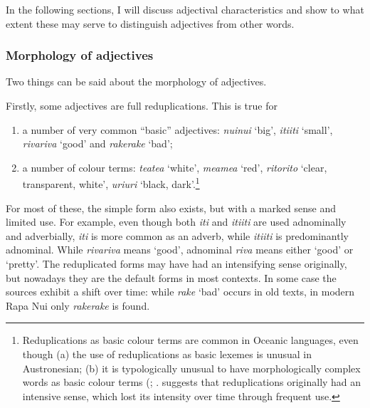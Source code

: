 In the following sections, I will discuss adjectival characteristics and show to what extent these may serve to distinguish adjectives from other words.

\subsubsection[Morphology of adjectives]{Morphology of adjectives}\label{sec:3.5.1.2}

Two things can be said about the morphology of adjectives.

Firstly, some adjectives are full reduplications. This is true for 

\begin{enumerate}
\item 
a number of very common “basic” adjectives: \textit{nuinui} ‘big’, \textit{{\ꞌ}iti{\ꞌ}iti} ‘small’, \textit{rivariva} ‘good’ and \textit{rakerake} ‘bad’; 

\item 
a number of colour terms: \textit{teatea} ‘white’, \textit{meamea} ‘red’, \textit{ritorito} ‘clear, transparent, white’, \textit{{\ꞌ}uri{\ꞌ}uri} ‘black, dark’.\footnote{\label{fn:121}Reduplications as basic colour terms are common in Oceanic languages, even though (a) the use of reduplications as basic lexemes is unusual in Austronesian; (b) it is typologically unusual to have morphologically complex words as basic colour terms (\citealt{Blust2001}; \citealt[304]{Blust2013}. \citet[42]{Blust2001} suggests that reduplications originally had an intensive sense, which lost its intensity over time through frequent use.}  

\end{enumerate}

For most of these, the simple form also exists, but with a marked sense and limited use. For example, even though both \textit{{\ꞌ}iti} and \textit{{\ꞌ}iti{\ꞌ}iti} are used adnominally and adverbially, \textit{{\ꞌ}iti} is more common as an adverb, while \textit{{\ꞌ}iti{\ꞌ}iti} is predominantly adnominal. While \textit{rivariva} means ‘good’, adnominal \textit{riva} means either ‘good’ or ‘pretty’. The reduplicated forms may have had an intensifying sense originally, but nowadays they are the default forms in most contexts. In some case the sources exhibit a shift over time: while \textit{rake} ‘bad’ occurs in old texts, in modern Rapa Nui only \textit{rakerake} is found.

